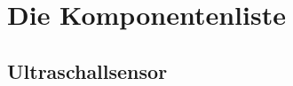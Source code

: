 \renewcommand{\autoren}{Valentyn Chepil}
\newpage
\section{Die Komponentenliste}
\subsection{Ultraschallsensor}


\newpage
